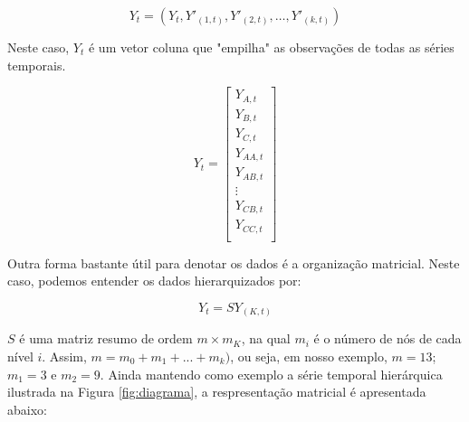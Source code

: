 \documentclass[
	12pt,				%
	openright,			%
	twoside,			%
	a4paper,			%
	english,			%
	french,				%
	spanish,			%
	brazil				%
	]{abntex2}
\begin{document}
\begin{equation}
Y_t=(Y_t, Y'_{(1,t)},Y'_{(2,t)},…,Y'_{(k,t)})
\end{equation}

Neste caso, $Y_t$ é um vetor coluna que "empilha" as observações de todas as séries temporais.

\[Y_t = \begin{bmatrix}
Y_{A,t}\\[0.3em]
Y_{B,t}\\[0.3em]
Y_{C,t}\\[0.3em]
Y_{AA,t}\\[0.3em]
Y_{AB,t}\\[0.3em]
\vdots\\[0.3em]
Y_{CB,t}\\[0.3em]
Y_{CC,t}\\[0.3em]
\end{bmatrix}
\]

Outra forma bastante útil para denotar os dados é a organização matricial. Neste caso, podemos entender os dados hierarquizados por:

\begin{equation}
\label{eq:summingmatrix}
Y_t=SY_{(K,t)}
\end{equation}

$S$ é uma matriz resumo de ordem $m \times m_K$, na qual $m_i$ é o número de nós  de cada nível $i$. Assim, $m= m_0 + m_1 + ... + m_k)$, ou seja, em nosso exemplo, $m=13$; $m_1=3$ e $m_2=9$. Ainda mantendo como exemplo a série temporal hierárquica ilustrada na Figura \ref{fig:diagrama}, a respresentação matricial é apresentada abaixo:
\end{document}
